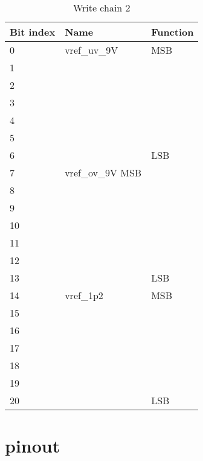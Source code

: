 \begin{table}[!htbp]
\centering
\begin{tabular}{@{}lll@{}}
\toprule
Bit index & Name & Function \\ \toprule
0 &	vref\_uv\_9V	 & MSB \\
1 & & \\
2 & & \\
3 & & \\
4 & & \\
5 & & \\
6	&	& LSB \\
7	& vref\_ov\_9V MSB \\
8  & & \\
9  & & \\
10 & & \\
11 & & \\
12 & & \\
13 & & LSB \\
14 & vref\_1p2 &	MSB \\
15 & & \\
16 & & \\
17 & & \\
18 & & \\
19 & & \\
20 & & LSB \\
\bottomrule
\end{tabular}
\caption{Write chain 2}
\label{tab:write-chain-2}
\end{table}

\section{pinout}
\label{apx:testchip-pinout}
